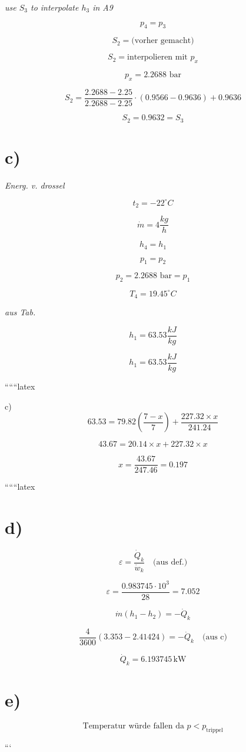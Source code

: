 \textit{use $S_3$ to interpolate $h_3$ in A9}

\[
p_4 = p_3
\]

\[
S_2 = \text{(vorher gemacht)}
\]

\[
S_2 = \text{interpolieren mit } p_x
\]

\[
p_x = 2.2688 \text{ bar}
\]

\[
S_2 = \frac{2.2688 - 2.25}{2.2688 - 2.25} \cdot (0.9566 - 0.9636) + 0.9636
\]

\[
S_2 = 0.9632 = S_3
\]

\section*{c)}

\textit{Energ. v. drossel}

\[
t_2 = -22^\circ C
\]

\[
\dot{m} = 4 \frac{kg}{h}
\]

\[
h_4 = h_1
\]

\[
p_1 = p_2
\]

\[
p_2 = 2.2688 \text{ bar} = p_1
\]

\[
T_4 = 19.45^\circ C
\]

\textit{aus Tab.}

\[
h_1 = 63.53 \frac{kJ}{kg}
\]

\[
h_1 = 63.53 \frac{kJ}{kg}
\]

``````latex


c)
\[
63.53 = 79.82 \left( \frac{7 - x}{7} \right) + \frac{227.32 \times x}{241.24}
\]

\[
43.67 = 20.14 \times x + 227.32 \times x
\]

\[
x = \frac{43.67}{247.46} = 0.197
\]

``````latex


\section*{d)}

\begin{equation*}
\varepsilon = \frac{\dot{Q}_k}{\dot{w}_k} \quad \text{(aus def.)}
\end{equation*}

\begin{equation*}
\varepsilon = \frac{0.983745 \cdot 10^3}{28} = 7.052
\end{equation*}

\begin{equation*}
\dot{m} (h_1 - h_2) = -\dot{Q}_k
\end{equation*}

\begin{equation*}
\frac{4}{3600} \left(3.353 - 2.41424\right) = -\dot{Q}_k \quad \text{(aus c)}
\end{equation*}

\begin{equation*}
\dot{Q}_k = 6.193745 \, \text{kW}
\end{equation*}

\section*{e)}

\begin{equation*}
\text{Temperatur würde fallen da } p < p_{\text{trippel}}
\end{equation*}

```